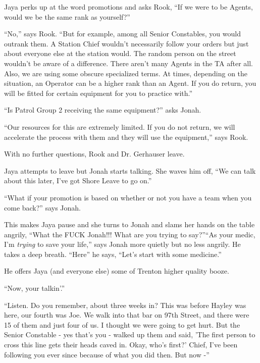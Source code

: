 Jaya perks up at the word promotions and asks Rook, ``If we were to be Agents, would we be the same rank as yourself?''

``No,'' says Rook.  ``But for example, among all Senior Constables, you would outrank them.  A Station Chief wouldn't necessarily follow your orders but just about everyone else at the station would.  The random person on the street wouldn't be aware of a difference.  There aren't many Agents in the TA after all.  Also, we are using some obscure specialized terms. At times, depending on the situation, an Operator can be a higher rank than an Agent.  If you do return, you will be fitted for certain equipment for you to practice with.''

``Is Patrol Group 2 receiving the same equipment?'' asks Jonah.

``Our resources for this are extremely limited.  If you do not return, we will accelerate the process with them and they will use the equipment,'' says Rook.



With no further questions, Rook and Dr. Gerhauser leave. 



Jaya attempts to leave but Jonah starts talking. She waves him off, ``We can talk about this later, I've got Shore Leave to go on.''

``What if your promotion is based on whether or not you have a team when you come back?'' says Jonah.

This makes Jaya pause and she turns to Jonah and slams her hands on the table angrily, ``What the FUCK Jonah!!!  What are you trying to say?''``As your medic, I'm \textit{trying} to save your life,'' says Jonah more quietly but no less angrily.  He takes a deep breath.  ``Here'' he says, ``Let's start with some medicine.''

He offers Jaya (and everyone else) some of Trenton higher quality booze.

``Now, your talkin'.''

``Listen.  Do you remember, about three weeks in?  This was before Hayley was here, our fourth was Joe.  We walk into that bar on 97th Street, and there were 15 of them and just four of us.  I thought we were going to get hurt.  But the Senior Constable - yes that's you - walked up them and said, 'The first person to cross this line gets their heads caved in.  Okay, who's first?'  Chief, I've been following you ever since because of what you did then.  But now -''

